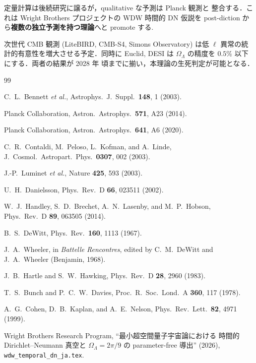 \documentclass[11pt,a4paper]{article}
\begin{document}
定量計算は後続研究に譲るが，qualitative な予測は Planck 観測と
整合する．これは Wright Brothers プロジェクトの WDW 時間的 DN 仮説を
post-diction から\textbf{複数の独立予測を持つ理論}へと promote する.

次世代 CMB 観測 (LiteBIRD, CMB-S4, Simons Observatory) は低 $\ell$
異常の統計的有意性を増大させる予定．同時に Euclid, DESI は
$\Omega_\Lambda$ の精度を $0.5\%$ 以下にする．両者の結果が 2028 年
頃までに揃い，本理論の生死判定が可能となる．

\begin{thebibliography}{99}

C.~L.~Bennett \textit{et al.}, Astrophys.\ J.\ Suppl.\ \textbf{148}, 1 (2003).

Planck Collaboration, Astron.\ Astrophys.\ \textbf{571}, A23 (2014).

Planck Collaboration, Astron.\ Astrophys.\ \textbf{641}, A6 (2020).

C.~R.~Contaldi, M.~Peloso, L.~Kofman, and A.~Linde,
J.\ Cosmol.\ Astropart.\ Phys.\ \textbf{0307}, 002 (2003).

J.-P.~Luminet \textit{et al.}, Nature \textbf{425}, 593 (2003).

U.~H.~Danielsson, Phys.\ Rev.\ D \textbf{66}, 023511 (2002).

W.~J.~Handley, S.~D.~Brechet, A.~N.~Lasenby, and M.~P.~Hobson,
Phys.\ Rev.\ D \textbf{89}, 063505 (2014).

B.~S.~DeWitt, Phys.\ Rev.\ \textbf{160}, 1113 (1967).

J.~A.~Wheeler, in \textit{Battelle Rencontres}, edited by
C.~M.~DeWitt and J.~A.~Wheeler (Benjamin, 1968).

J.~B.~Hartle and S.~W.~Hawking, Phys.\ Rev.\ D \textbf{28}, 2960 (1983).

T.~S.~Bunch and P.~C.~W.~Davies, Proc.\ R.\ Soc.\ Lond.\ A \textbf{360}, 117 (1978).

A.~G.~Cohen, D.~B.~Kaplan, and A.~E.~Nelson,
Phys.\ Rev.\ Lett.\ \textbf{82}, 4971 (1999).

Wright Brothers Research Program, ``最小超空間量子宇宙論における
時間的 Dirichlet--Neumann 真空と $\Omega_\Lambda = 2\pi/9$ の
parameter-free 導出'' (2026), \texttt{wdw\_temporal\_dn\_ja.tex}.

\end{thebibliography}
\end{document}
